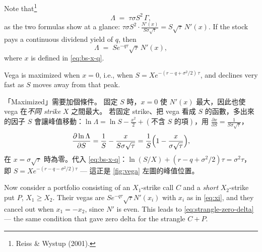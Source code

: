\suppstart
{}
\suppend

Note that\footnote{Reiss \& Wystup (2001).}
\begin{equation}
	\Lambda \;=\; \tau\sigma S^{2}\,\Gamma ,
	\label{eq:vega-gamma}
\end{equation}
\suppstart
as the two formulas show at a glance: $\tau\sigma S^{2}\cdot\frac{N'(x)}{S\sigma\sqrt{\tau}}=S\sqrt{\tau}\,N'(x)$.
\suppend
If the stock pays a continuous dividend yield of $q$, then
\[
	\Lambda \;=\; Se^{-q\tau}\sqrt{\tau}\,N'(x) ,
\]
where $x$ is defined in \eqref{eq:bs-x-q}.

\suppstart
{}

Vega is maximized when $x=0$, i.e., when $S=Xe^{-(r-q+\sigma^{2}/2)\,\tau}$, and declines very fast as $S$ moves away from that peak.


\begin{note}
	「Maximized」需要加個條件。
	固定 $S$ 時，$x=0$ 使 $N'(x)$ 最大，因此也使 vega 在\emph{不同 strike} $X$ 之間最大。
	若固定 strike、把 vega 看成 $S$ 的函數，多出來的因子 $S$ 會讓峰值移動：$\ln\Lambda=\ln S-\frac{x^{2}}{2}+(\text{不含 }S\text{ 的項})$，用 $\frac{\partial x}{\partial S}=\frac{1}{S\sigma\sqrt{\tau}}$，
	\[
		\frac{\partial\ln\Lambda}{\partial S}=\frac1S-\frac{x}{S\sigma\sqrt{\tau}}=\frac{1}{S}\Bigl(1-\frac{x}{\sigma\sqrt{\tau}}\Bigr) ,
	\]
	在 $x=\sigma\sqrt{\tau}$ 時為零。代入 \eqref{eq:bs-x-q}：$\ln(S/X)+(r-q+\sigma^{2}/2)\tau=\sigma^{2}\tau$，即 $S=Xe^{-(r-q-\sigma^{2}/2)\tau}$ --- 這正是 \autoref{fig:vega} 左圖的峰值位置。
\end{note}
\suppend

Now consider a portfolio consisting of an $X_{1}$-strike call $C$ and a \emph{short} $X_{2}$-strike put $P$, $X_{1}\ge X_{2}$.
Their vegas are $Se^{-q\tau}\sqrt{\tau}N'(x_{i})$ with $x_{i}$ as in \eqref{eq:xi}, and they cancel out when $x_{1}=-x_{2}$, since $N'$ is even.
This leads to \eqref{eq:strangle-zero-delta} --- the same condition that gave zero delta for the strangle $C+P$.

\suppstart
{}


